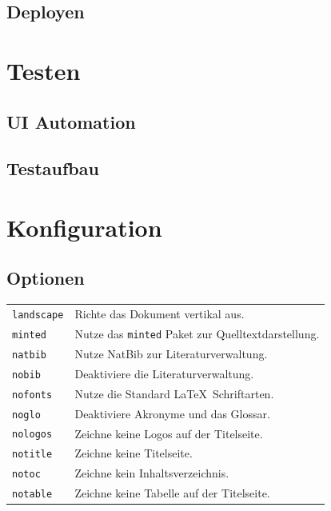 \subsection{Deployen}

\section{Testen}

\subsection{UI Automation}

\subsection{Testaufbau}




\clearpage

\section{Konfiguration}
\subsection{Optionen}
\begin{tabularx}{\textwidth}{l X}
{\small \verb|landscape|}    & Richte das Dokument vertikal aus.\\
{\small \verb|minted|}       & Nutze das \texttt{minted} Paket zur Quelltextdarstellung.\\
{\small \verb|natbib|}       & Nutze NatBib zur Literaturverwaltung.\\
{\small \verb|nobib|}        & Deaktiviere die Literaturverwaltung.\\
{\small \verb|nofonts|}      & Nutze die Standard \LaTeX ~Schriftarten.\\
{\small \verb|noglo|}        & Deaktiviere Akronyme und das Glossar.\\
{\small \verb|nologos|}      & Zeichne keine Logos auf der Titelseite.\\
{\small \verb|notitle|}      & Zeichne keine Titelseite.\\
{\small \verb|notoc|}        & Zeichne kein Inhaltsverzeichnis.\\
{\small \verb|notable|}      & Zeichne keine Tabelle auf der Titelseite.
\end{tabularx}

